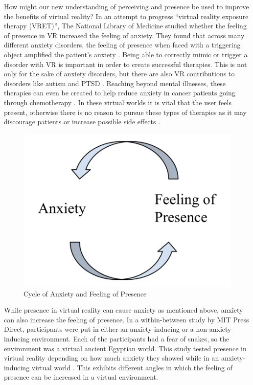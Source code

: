 \documentclass[manuscript,screen,review]{acmart}
\begin{document}
How might our new understanding of perceiving and presence be used to improve the benefits of virtual reality? In an attempt to progress “virtual reality exposure therapy (VRET)”, The National Library of Medicine studied whether the feeling of presence in VR increased the feeling of anxiety. They found that across many different anxiety disorders, the feeling of presence when faced with a triggering object amplified the patient's anxiety \cite{LING}. Being able to correctly mimic or trigger a disorder with VR is important in order to create successful therapies. This is not only for the sake of anxiety disorders, but there are also VR contributions to disorders like autism \cite{STRICKLAND} and PTSD \cite{RIZZO}. Reaching beyond mental illnesses, these therapies can even be created to help reduce anxiety in cancer patients going through chemotherapy \cite{CHOW}. In these virtual worlds it is vital that the user feels present, otherwise there is no reason to pursue these types of therapies as it may discourage patients or increase possible side effects \cite{KNIGHT}.

\begin{figure}[ht]
  \centering
  \includegraphics[width=\linewidth]{CycleOfAnxietyAndFeelingOfPresence.png}
  \caption{Cycle of Anxiety and Feeling of Presence}
\end{figure}

While presence in virtual reality can cause anxiety as mentioned above, anxiety can also increase the feeling of presence. In a within-between study by MIT Press Direct, participants were put in either an anxiety-inducing or a non-anxiety-inducing environment. Each of the participants had a fear of snakes, so the environment was a virtual ancient Egyptian world. This study tested presence in virtual reality depending on how much anxiety they showed while in an anxiety-inducing virtual world \cite{BOUCHARD}. This exhibits different angles in which the feeling of presence can be increased in a virtual environment. 
\end{document}
